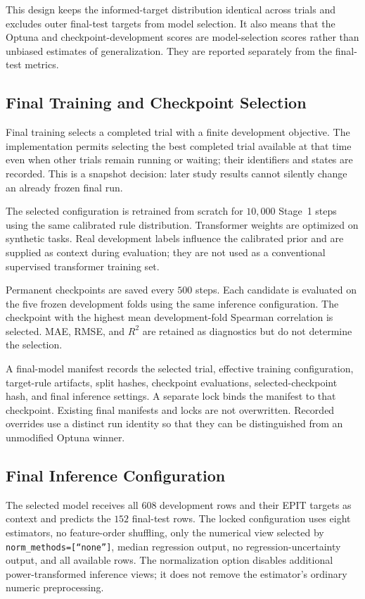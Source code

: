\documentclass{article}
\begin{document}
This design keeps the informed-target distribution identical across trials
and excludes outer final-test targets from model selection. It also means
that the Optuna and checkpoint-development scores are model-selection scores
rather than unbiased estimates of generalization. They are reported separately
from the final-test metrics.

\subsection{Final Training and Checkpoint Selection}

Final training selects a completed trial with a finite development objective.
The implementation permits selecting the best completed trial available at
that time even when other trials remain running or waiting; their identifiers
and states are recorded. This is a snapshot decision: later study results
cannot silently change an already frozen final run.

The selected configuration is retrained from scratch for \(10{,}000\)
Stage~1 steps using the same calibrated rule distribution. Transformer weights
are optimized on synthetic tasks. Real development labels influence the
calibrated prior and are supplied as context during evaluation; they are not
used as a conventional supervised transformer training set.

Permanent checkpoints are saved every \(500\) steps. Each candidate is
evaluated on the five frozen development folds using the same inference
configuration. The checkpoint with the highest mean development-fold Spearman
correlation is selected. MAE, RMSE, and \(R^2\) are retained as diagnostics
but do not determine the selection.

A final-model manifest records the selected trial, effective training
configuration, target-rule artifacts, split hashes, checkpoint evaluations,
selected-checkpoint hash, and final inference settings. A separate lock binds
the manifest to that checkpoint. Existing final manifests and locks are not
overwritten. Recorded overrides use a distinct run identity so that they can
be distinguished from an unmodified Optuna winner.

\subsection{Final Inference Configuration}

The selected model receives all \(608\) development rows and their EPIT
targets as context and predicts the \(152\) final-test rows. The locked
configuration uses eight estimators, no feature-order shuffling, only the
numerical view selected by \texttt{norm\_methods=[``none'']}, median
regression output, no regression-uncertainty output, and all available rows.
The normalization option disables additional power-transformed inference
views; it does not remove the estimator's ordinary numeric preprocessing.
\end{document}
